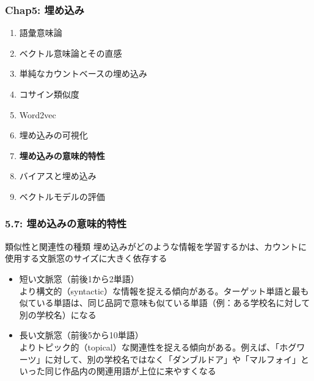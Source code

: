 \documentclass[unicode,11pt]{beamer} %
\begin{document}
\begin{frame}
    \frametitle{Chap5: 埋め込み}
    \begin{block}{}
        \begin{enumerate}
            \item 語彙意味論
            \item ベクトル意味論とその直感
            \item 単純なカウントベースの埋め込み
            \item コサイン類似度
            \item Word2vec
            \item 埋め込みの可視化
            \item {\color{red}\textbf{埋め込みの意味的特性}}
            \item バイアスと埋め込み
            \item ベクトルモデルの評価
        \end{enumerate}
    \end{block}
\end{frame}

\begin{frame}
    \frametitle{5.7: 埋め込みの意味的特性}
    \begin{alertblock}{類似性と関連性の種類}
        埋め込みがどのような情報を学習するかは、カウントに使用する文脈窓のサイズに大きく依存する
        \begin{itemize}
            \item 短い文脈窓（前後1から2単語）\\より構文的（syntactic）な情報を捉える傾向がある。ターゲット単語と最も似ている単語は、同じ品詞で意味も似ている単語（例：ある学校名に対して別の学校名）になる
            \item 長い文脈窓（前後5から10単語）\\よりトピック的（topical）な関連性を捉える傾向がある。例えば、「ホグワーツ」に対して、別の学校名ではなく「ダンブルドア」や「マルフォイ」といった同じ作品内の関連用語が上位に来やすくなる
        \end{itemize}
    \end{alertblock}
\end{frame}
\end{document}
